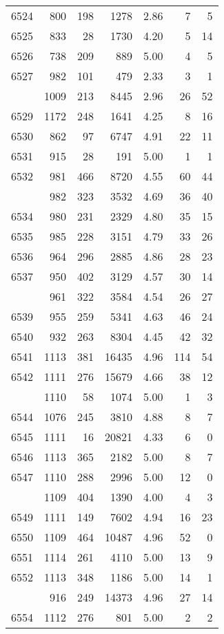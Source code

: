 \documentclass[
]{article}
\begin{document}
\begin{table}
\begin{tabular}[t]{lrrrrrr}
6524 & 800 & 198 & 1278 & 2.86 & 7 & 5\\
6525 & 833 & 28 & 1730 & 4.20 & 5 & 14\\
6526 & 738 & 209 & 889 & 5.00 & 4 & 5\\
6527 & 982 & 101 & 479 & 2.33 & 3 & 1\\
\addlinespace
6528 & 1009 & 213 & 8445 & 2.96 & 26 & 52\\
6529 & 1172 & 248 & 1641 & 4.25 & 8 & 16\\
6530 & 862 & 97 & 6747 & 4.91 & 22 & 11\\
6531 & 915 & 28 & 191 & 5.00 & 1 & 1\\
6532 & 981 & 466 & 8720 & 4.55 & 60 & 44\\
\addlinespace
6533 & 982 & 323 & 3532 & 4.69 & 36 & 40\\
6534 & 980 & 231 & 2329 & 4.80 & 35 & 15\\
6535 & 985 & 228 & 3151 & 4.79 & 33 & 26\\
6536 & 964 & 296 & 2885 & 4.86 & 28 & 23\\
6537 & 950 & 402 & 3129 & 4.57 & 30 & 14\\
\addlinespace
6538 & 961 & 322 & 3584 & 4.54 & 26 & 27\\
6539 & 955 & 259 & 5341 & 4.63 & 46 & 24\\
6540 & 932 & 263 & 8304 & 4.45 & 42 & 32\\
6541 & 1113 & 381 & 16435 & 4.96 & 114 & 54\\
6542 & 1111 & 276 & 15679 & 4.66 & 38 & 12\\
\addlinespace
6543 & 1110 & 58 & 1074 & 5.00 & 1 & 3\\
6544 & 1076 & 245 & 3810 & 4.88 & 8 & 7\\
6545 & 1111 & 16 & 20821 & 4.33 & 6 & 0\\
6546 & 1113 & 365 & 2182 & 5.00 & 8 & 7\\
6547 & 1110 & 288 & 2996 & 5.00 & 12 & 0\\
\addlinespace
6548 & 1109 & 404 & 1390 & 4.00 & 4 & 3\\
6549 & 1111 & 149 & 7602 & 4.94 & 16 & 23\\
6550 & 1109 & 464 & 10487 & 4.96 & 52 & 0\\
6551 & 1114 & 261 & 4110 & 5.00 & 13 & 9\\
6552 & 1113 & 348 & 1186 & 5.00 & 14 & 1\\
\addlinespace
6553 & 916 & 249 & 14373 & 4.96 & 27 & 14\\
6554 & 1112 & 276 & 801 & 5.00 & 2 & 2\\

\end{tabular}
\end{table}
\end{document}
